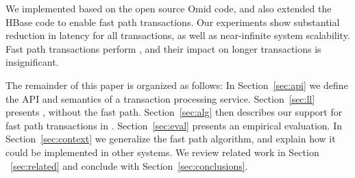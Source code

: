 We implemented {\sys\/} based on the open source Omid code, and also extended the HBase code to 
enable fast path transactions. Our experiments show substantial reduction in latency for all transactions, 
as well as near-infinite system scalability. Fast path transactions perform , and their impact on longer transactions is insignificant. 

The remainder of this paper is organized as follows:
In Section~\ref{sec:api} we define the  API and semantics of a transaction processing service. 
Section~\ref{sec:ll} presents \sys, without the fast path. 
Section~\ref{sec:alg} then describes our support for fast path  transactions in \sys.  
Section~\ref{sec:eval} presents an empirical evaluation.
In Section~\ref{sec:context} we generalize the fast path algorithm, and explain how it could be implemented in 
other systems. We review related work in Section ~\ref{sec:related} and conclude with Section~\ref{sec:conclusions}.
